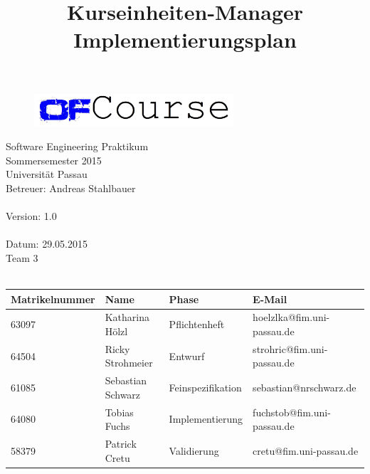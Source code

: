 \documentclass[a4paper, 12pt]{scrreprt}
\begin{document}
	\thispagestyle{plain}

\begin{titlepage}
    \begin{center}
        \begin{figure}[ht]
            \centering
            \includegraphics[width=0.66\textwidth, angle=0]{logo/name_blau_ofCourse.jpg}
        \end{figure}

    	\begin{title}
        	\title{\Huge{\textbf{Kurseinheiten-Manager \\ Implementierungsplan\\}}}

		\end{title}
		\hspace{3cm}

        	Software Engineering Praktikum \\
        	Sommersemester 2015\\
        	Universität Passau\\


        	Betreuer: Andreas Stahlbauer \\
        	\hspace{1,5cm}\\
        	Version: 1.0 \\
        	\hspace{1,5cm}\\
        	Datum: 29.05.2015\\[50pt]
        	Team 3 \\
    
		    \ \\
        
        \begin{tabular}{ | l | l | l | l |}
        	\hline
        	\textbf{Matrikelnummer} & \textbf{Name} & \textbf{Phase} & \textbf{E-Mail}  \\ \hline
        	63097 & Katharina Hölzl & Pflichtenheft & hoelzlka@fim.uni-passau.de \\ \hline
        	64504 & Ricky Strohmeier& Entwurf & strohric@fim.uni-passau.de  \\ \hline
        	61085 & Sebastian Schwarz & Feinspezifikation & sebastian@nrschwarz.de \\ \hline 
        	64080 & Tobias Fuchs & Implementierung  &  fuchstob@fim.uni-passau.de\\ \hline
        	58379 & Patrick Cretu  &  Validierung & cretu@fim.uni-passau.de \\ \hline
        \end{tabular}
        
        \ \\
        \ \\
       
        
        
    \end{center}
\end{titlepage}


\tableofcontents






\end{document}
